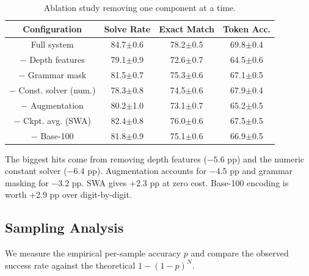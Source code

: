 \documentclass[conference]{IEEEtran}
\begin{document}
\begin{table}[htbp]
\caption{Ablation study removing one component at a time.}
\begin{center}
\begin{tabular}{|c|c|c|c|}
\hline
\textbf{Configuration} & \textbf{Solve Rate} & \textbf{Exact Match} & \textbf{Token Acc.} \\
\hline
Full system & 84.7\footnotesize{$\pm$0.6} & 78.2\footnotesize{$\pm$0.5} & 69.8\footnotesize{$\pm$0.4} \\
\hline
$-$ Depth features & 79.1\footnotesize{$\pm$0.9} & 72.6\footnotesize{$\pm$0.7} & 64.5\footnotesize{$\pm$0.6} \\
\hline
$-$ Grammar mask & 81.5\footnotesize{$\pm$0.7} & 75.3\footnotesize{$\pm$0.6} & 67.1\footnotesize{$\pm$0.5} \\
\hline
$-$ Const. solver (num.) & 78.3\footnotesize{$\pm$0.8} & 74.5\footnotesize{$\pm$0.6} & 67.9\footnotesize{$\pm$0.4} \\
\hline
$-$ Augmentation & 80.2\footnotesize{$\pm$1.0} & 73.1\footnotesize{$\pm$0.7} & 65.2\footnotesize{$\pm$0.5} \\
\hline
$-$ Ckpt. avg. (SWA) & 82.4\footnotesize{$\pm$0.8} & 76.0\footnotesize{$\pm$0.6} & 67.5\footnotesize{$\pm$0.5} \\
\hline
$-$ Base-100 & 81.8\footnotesize{$\pm$0.9} & 75.1\footnotesize{$\pm$0.6} & 66.9\footnotesize{$\pm$0.5} \\
\hline
\end{tabular}
\label{tab:ablation}
\end{center}
\end{table}

The biggest hits come from removing depth features ($-5.6$ pp) and the numeric constant solver ($-6.4$ pp). Augmentation accounts for $-4.5$ pp and grammar masking for $-3.2$ pp. SWA gives +2.3 pp at zero cost. Base-100 encoding is worth +2.9 pp over digit-by-digit.

\subsection{Sampling Analysis}

We measure the empirical per-sample accuracy $p$ and compare the observed success rate against the theoretical $1 - (1 - p)^N$.
\end{document}
